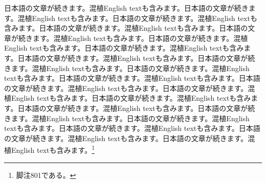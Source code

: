 \documentclass[pdflatex,book]{jlreq}
\begin{document}
日本語の文章が続きます。混植English textも含みます。日本語の文章が続きます。混植English textも含みます。日本語の文章が続きます。混植English textも含みます。日本語の文章が続きます。混植English textも含みます。日本語の文章が続きます。混植English textも含みます。日本語の文章が続きます。混植English textも含みます。日本語の文章が続きます。混植English textも含みます。日本語の文章が続きます。混植English textも含みます。日本語の文章が続きます。混植English textも含みます。日本語の文章が続きます。混植English textも含みます。日本語の文章が続きます。混植English textも含みます。日本語の文章が続きます。混植English textも含みます。日本語の文章が続きます。混植English textも含みます。日本語の文章が続きます。混植English textも含みます。日本語の文章が続きます。混植English textも含みます。日本語の文章が続きます。混植English textも含みます。日本語の文章が続きます。混植English textも含みます。日本語の文章が続きます。混植English textも含みます。日本語の文章が続きます。混植English textも含みます。日本語の文章が続きます。混植English textも含みます。\footnote{脚注801である。}
\end{document}
